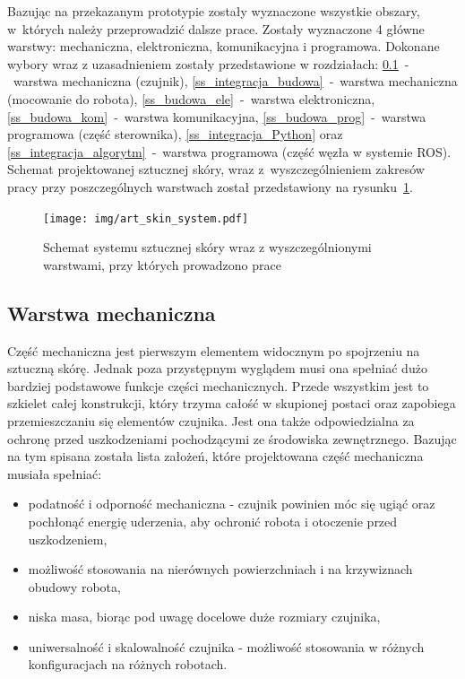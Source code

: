 Bazując na przekazanym prototypie zostały wyznaczone wszystkie obszary, w~których należy przeprowadzić dalsze prace. Zostały wyznaczone 4 główne warstwy: mechaniczna, elektroniczna, komunikacyjna i programowa. Dokonane wybory wraz z uzasadnieniem zostały przedstawione w rozdziałach: \ref{ss_budowa_mech}~-~warstwa mechaniczna (czujnik), \ref{ss_integracja_budowa}~-~warstwa mechaniczna (mocowanie do robota), \ref{ss_budowa_ele}~-~warstwa elektroniczna, \ref{ss_budowa_kom}~-~warstwa komunikacyjna, \ref{ss_budowa_prog}~-~warstwa programowa (część sterownika), \ref{ss_integracja_Python} oraz \ref{ss_integracja_algorytm}~-~warstwa programowa (część węzła w systemie ROS).
Schemat projektowanej sztucznej skóry, wraz z~wyszczególnieniem zakresów pracy przy poszczególnych warstwach został przedstawiony na rysunku~\ref{f_art_skin_system}.

\begin{figure}[!h]
    \centering 
    \texttt{[image: img/art\_skin\_system.pdf]}
    \caption{Schemat systemu sztucznej skóry wraz z wyszczególnionymi warstwami, przy których prowadzono prace}
    \label{f_art_skin_system}
\end{figure}

\subsection{Warstwa mechaniczna}
\label{ss_budowa_mech}

Część mechaniczna jest pierwszym elementem widocznym po spojrzeniu na sztuczną skórę. Jednak poza przystępnym wyglądem musi ona spełniać dużo bardziej podstawowe funkcje części mechanicznych. Przede wszystkim jest to szkielet całej konstrukcji, który trzyma całość w skupionej postaci oraz zapobiega przemieszczaniu się elementów czujnika. Jest ona także odpowiedzialna za ochronę przed uszkodzeniami pochodzącymi ze środowiska zewnętrznego. Bazując na tym spisana została lista założeń, które projektowana część mechaniczna musiała spełniać:
\begin{itemize}
    \item podatność i odporność mechaniczna - czujnik powinien móc się ugiąć oraz pochłonąć energię uderzenia, aby ochronić robota i otoczenie przed uszkodzeniem,
    \item możliwość stosowania na nierównych powierzchniach i na krzywiznach obudowy robota,
    \item niska masa, biorąc pod uwagę docelowe duże rozmiary czujnika,
    \item uniwersalność i skalowalność czujnika - możliwość stosowania w różnych konfiguracjach na różnych robotach.
\end{itemize}

